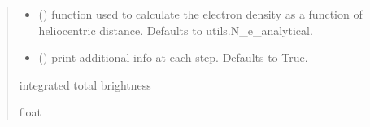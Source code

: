 \documentclass[letterpaper,10pt,english]{sphinxmanual}
\begin{document}
\begin{fulllineitems}
\begin{quote}
\begin{description}
\begin{itemize}
\item {} 
\sphinxAtStartPar
{} (\sphinxstyleliteralemphasis{\sphinxupquote{, }}) \textendash{} function used to calculate the electron density as a function of heliocentric distance. Defaults to utils.N\_e\_analytical.

\item {} 
\sphinxAtStartPar
{} (\sphinxstyleliteralemphasis{\sphinxupquote{, }}) \textendash{} print additional info at each step. Defaults to True.

\end{itemize}

\sphinxAtStartPar
integrated total brightness

\sphinxAtStartPar
float

\end{description}\end{quote}

\end{fulllineitems}

\end{document}
